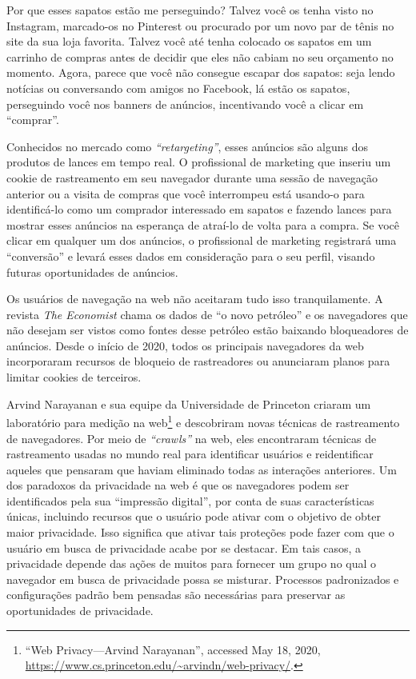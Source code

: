 \documentclass{book}
\newcommand{\ingles}[1]{\textit{#1}}
\begin{document}
Por que esses sapatos estão me perseguindo? Talvez você os tenha visto no
Instagram, marcado-os no Pinterest ou procurado por um novo par de tênis no
site da sua loja favorita. Talvez você até tenha colocado os sapatos em um
carrinho de compras antes de decidir que eles não cabiam no seu orçamento no
momento. Agora, parece que você não consegue escapar dos sapatos: seja lendo
notícias ou conversando com amigos no Facebook, lá estão os sapatos,
perseguindo você nos banners de anúncios, incentivando você a clicar em
``comprar''.

Conhecidos no mercado como \ingles{``retargeting''}, esses anúncios são alguns
dos produtos de lances em tempo real. O profissional de marketing que inseriu
um cookie de rastreamento em seu navegador durante uma sessão de navegação
anterior ou a visita de compras que você interrompeu está usando-o para
identificá-lo como um comprador interessado em sapatos e fazendo lances para
mostrar esses anúncios na esperança de atraí-lo de volta para a compra. Se você
clicar em qualquer um dos anúncios, o profissional de marketing registrará uma
``conversão'' e levará esses dados em consideração para o seu perfil, visando
futuras oportunidades de anúncios.

Os usuários de navegação na web não aceitaram tudo isso tranquilamente. A
revista \ingles{The Economist} chama os dados de ``o novo petróleo'' e os
navegadores que não desejam ser vistos como fontes desse petróleo estão
baixando bloqueadores de anúncios. Desde o início de 2020, todos os principais
navegadores da web incorporaram recursos de bloqueio de rastreadores ou
anunciaram planos para limitar cookies de terceiros.

Arvind Narayanan e sua equipe da Universidade de Princeton criaram um
laboratório para medição na web\footnote{``Web Privacy—Arvind Narayanan'',
accessed May 18, 2020,
\url{https://www.cs.princeton.edu/~arvindn/web-privacy/}.} e descobriram novas
técnicas de rastreamento de navegadores. Por meio de \ingles{``crawls''} na
web, eles encontraram técnicas de rastreamento usadas no mundo real para
identificar usuários e reidentificar aqueles que pensaram que haviam eliminado
todas as interações anteriores. Um dos paradoxos da privacidade na web é que os
navegadores podem ser identificados pela sua ``impressão digital'', por conta
de suas características únicas, incluindo recursos que o usuário pode ativar
com o objetivo de obter maior privacidade. Isso significa que ativar tais
proteções pode fazer com que o usuário em busca de privacidade acabe por se
destacar. Em tais casos, a privacidade depende das ações de muitos para
fornecer um grupo no qual o navegador em busca de privacidade possa se
misturar. Processos padronizados e configurações padrão bem pensadas são
necessárias para preservar as oportunidades de privacidade.
\end{document}
